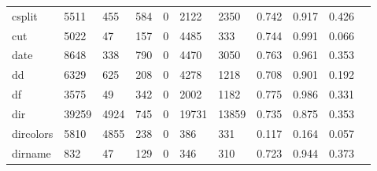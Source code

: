 \begin{longtable}{lp{1.10cm}p{1.10cm}p{1.10cm}p{1.10cm}p{1.10cm}p{1.10cm}p{1.10cm}p{1.10cm}p{1.10cm}p{1.10cm}}
csplit    &                   5511 &                                455 &                               584 &                                0 &                              2122 &                            2350 &                             0.742 &                                 0.917 &                               0.426 \\
cut       &                   5022 &                                 47 &                               157 &                                0 &                              4485 &                             333 &                             0.744 &                                 0.991 &                               0.066 \\
date      &                   8648 &                                338 &                               790 &                                0 &                              4470 &                            3050 &                             0.763 &                                 0.961 &                               0.353 \\
dd        &                   6329 &                                625 &                               208 &                                0 &                              4278 &                            1218 &                             0.708 &                                 0.901 &                               0.192 \\
df        &                   3575 &                                 49 &                               342 &                                0 &                              2002 &                            1182 &                             0.775 &                                 0.986 &                               0.331 \\
dir       &                  39259 &                               4924 &                               745 &                                0 &                             19731 &                           13859 &                             0.735 &                                 0.875 &                               0.353 \\
dircolors &                   5810 &                               4855 &                               238 &                                0 &                               386 &                             331 &                             0.117 &                                 0.164 &                               0.057 \\
dirname   &                    832 &                                 47 &                               129 &                                0 &                               346 &                             310 &                             0.723 &                                 0.944 &                               0.373 \\

\end{longtable}
